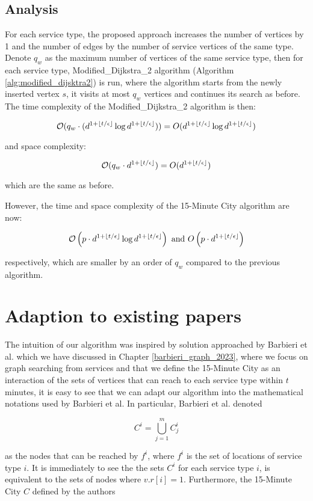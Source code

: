 \subsection{Analysis}

For each service type, the proposed approach increases the number of vertices by 1 and the number of edges by the number of service vertices of the same type. Denote $q_w$ as the maximum number of vertices of the same service type, then for each service type, Modified\_Dijkstra\_2 algorithm (Algorithm \ref{alg:modified_dijsktra2}) is run, where the algorithm starts from the newly inserted vertex $s$, it visits at most $q_w$ vertices and continues its search as before. The time complexity of the Modified\_Dijkstra\_2 algorithm is then:

$$\mathcal{O}(q_w\cdot(d^{1+\floor*{t/\epsilon}}\log d^{1+\floor*{t/\epsilon}}))=O(d^{1+\floor*{t/\epsilon}}\log d^{1+\floor*{t/\epsilon}})$$

and space complexity:

$$\mathcal{O}(q_w\cdot d^{1+\floor*{t/\epsilon}})=O(d^{1+\floor*{t/\epsilon}})$$

which are the same as before.

However, the time and space complexity of the 15-Minute City algorithm are now:

$$\mathcal{O}\left(p\cdot d^{1+\floor*{t/\epsilon}}\log d^{1+\floor*{t/\epsilon}}\right)\text{ and }O\left(p\cdot d^{1+\floor*{t/\epsilon}}\right)$$

respectively, which are smaller by an order of $q_w$ compared to the previous algorithm.

\section{Adaption to existing papers}

The intuition of our algorithm was inspired by solution approached by Barbieri et al. \cite{barbieri_graph_2023} which we have discussed in Chapter \ref{barbieri_graph_2023}, where we focus on graph searching from services and that we define the 15-Minute City as an interaction of the sets of vertices that can reach to each service type within $t$ minutes, it is easy to see that we can adapt our algorithm into the mathematical notations used by Barbieri et al. In particular, Barbieri et al. denoted

$$C^i=\bigcup\limits_{j=1}^m C^i_j$$

as the nodes that can be reached by $f^i$, where $f^i$ is the set of locations of service type $i$. It is immediately to see the the sets $C^i$ for each service type $i$, is equivalent to the sets of nodes where $v.r[i]=1$. Furthermore, the 15-Minute City $C$ defined by the authors

